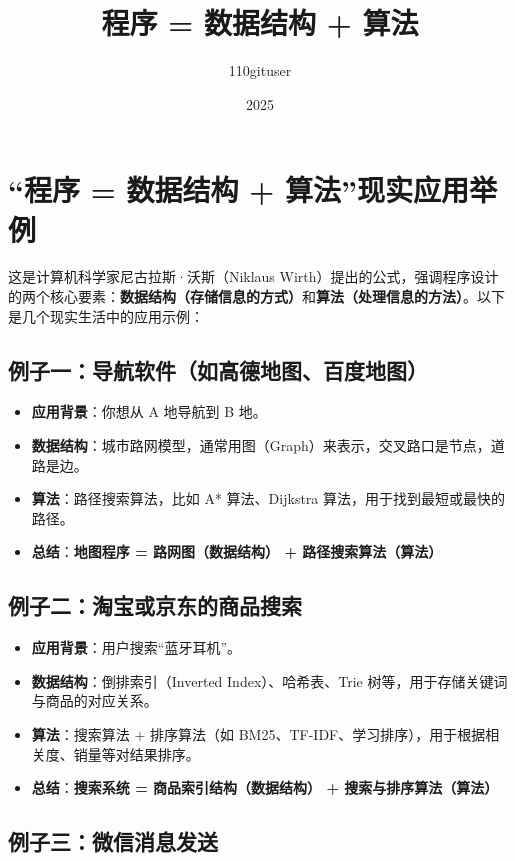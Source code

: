 \documentclass{article}
\title{程序 = 数据结构 + 算法}
\author{110gituser}
\date{2025}
\begin{document}
\maketitle

\section*{“程序 = 数据结构 + 算法”现实应用举例}

这是计算机科学家尼古拉斯·沃斯（Niklaus Wirth）提出的公式，强调程序设计的两个核心要素：\textbf{数据结构（存储信息的方式）}和\textbf{算法（处理信息的方法）}。以下是几个现实生活中的应用示例：

\subsection*{例子一：导航软件（如高德地图、百度地图）}

\begin{itemize}
    \item \textbf{应用背景}：你想从 A 地导航到 B 地。
    \item \textbf{数据结构}：城市路网模型，通常用图（Graph）来表示，交叉路口是节点，道路是边。
    \item \textbf{算法}：路径搜索算法，比如 A* 算法、Dijkstra 算法，用于找到最短或最快的路径。
    \item \textbf{总结}：\textbf{地图程序 = 路网图（数据结构） + 路径搜索算法（算法）}
\end{itemize}

\subsection*{例子二：淘宝或京东的商品搜索}

\begin{itemize}
    \item \textbf{应用背景}：用户搜索“蓝牙耳机”。
    \item \textbf{数据结构}：倒排索引（Inverted Index）、哈希表、Trie 树等，用于存储关键词与商品的对应关系。
    \item \textbf{算法}：搜索算法 + 排序算法（如 BM25、TF-IDF、学习排序），用于根据相关度、销量等对结果排序。
    \item \textbf{总结}：\textbf{搜索系统 = 商品索引结构（数据结构） + 搜索与排序算法（算法）}
\end{itemize}

\subsection*{例子三：微信消息发送}
\end{document}

